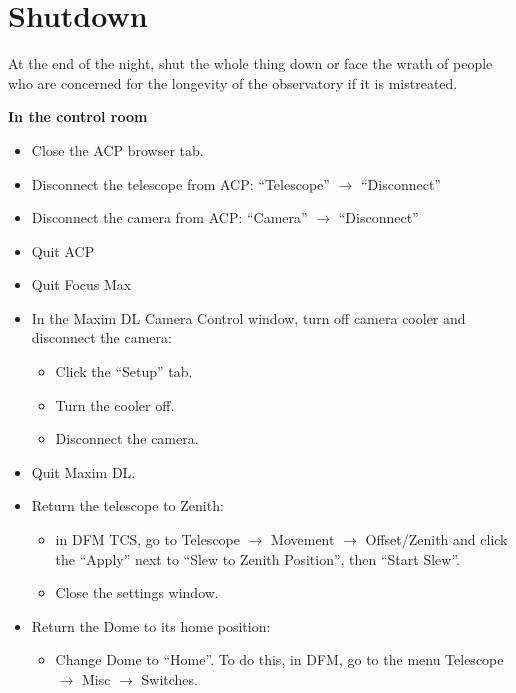 \documentclass[letterpaper, 12pt]{report}
\newcommand{\location}[1]{\noindent\large{\textbf{#1}}}
\newcommand{\incontrol}{\location{In the control room}}
\begin{document}

\newpage

\chapter{Shutdown}\label{ch:shutdown}

At the end of the night, shut the whole thing down or face the wrath of people who are concerned for the longevity of the observatory if it is mistreated.

\incontrol
\begin{itemize}
	\item Close the ACP browser tab.
	\item Disconnect the telescope from ACP: ``Telescope'' $\to$ ``Disconnect''
	\item Disconnect the camera from ACP: ``Camera'' $\to$ ``Disconnect''
	\item Quit ACP
	\item Quit Focus Max
	\item In the Maxim DL Camera Control window, turn off camera cooler and disconnect the camera:
		\begin{itemize}
			\item Click the ``Setup'' tab.
			\item Turn the cooler off.
			\item Disconnect the camera.
		\end{itemize}
	\item Quit Maxim DL.
	\item Return the telescope to Zenith:
	\begin{itemize}
		\item in DFM TCS, go to Telescope $\rightarrow$ Movement $\rightarrow$ Offset/Zenith and click the ``Apply'' next to ``Slew to Zenith Position'', then ``Start Slew''.
		\item Close the settings window.
	\end{itemize}
	\item Return the Dome to its home position:
		\begin{itemize}
			\item Change Dome to ``Home''. To do this, in DFM, go to the menu Telescope $\rightarrow$ Misc $\rightarrow$ Switches.

\end{itemize}
\end{itemize}
\end{document}
